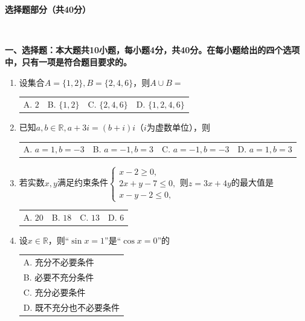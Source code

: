 \documentclass[UTF8]{ctexart}
\newcommand{\tmstrong}[1]{\textbf{#1}}
\begin{document}
\

\

\begin{center}
  {\tmstrong{选择题部分（共40分）}}
\end{center}

\

{\tmstrong{一、选择题：本大题共10小题，每小题4分，共40分。在每小题给出的四个选项中，只有一项是符合题目要求的。}}
\begin{enumerate}
  \item 设集合$A = \{ 1, 2 \}, B = \{ 2, 4, 6 \}$，则$A \cup B =$
  
  {\noindent}\begin{tabularx}{1.0\textwidth}{@{}X@{}@{}X@{}@{}X@{}@{}X@{}}
    A. $2$ & B. $\{ 1, 2 \}$ & C. $\{ 2, 4, 6 \}$ & D. $\{ 1, 2, 4, 6 \}$
  \end{tabularx}
  
  \item 已知$a, b \in \mathbb{R}, a + 3 i = (b + i)
  i$（$i$为虚数单位），则
  
  {\noindent}\begin{tabularx}{1.0\textwidth}{@{}X@{}@{}X@{}@{}X@{}@{}X@{}}
    A. $a = 1, b = - 3$ & B. $a = - 1, b = 3$ & C. $a = - 1, b = - 3$ & D. $a
    = 1, b = 3$
  \end{tabularx}
  
  \item 若实数$x, y$满足约束条件$\left\{\begin{array}{l}
    x - 2 \geqslant 0,\\
    2 x + y - 7 \leqslant 0,\\
    x - y - 2 \leqslant 0,
  \end{array}\right.$则$z = 3 x + 4 y$的最大值是
  
  {\noindent}\begin{tabularx}{1.0\textwidth}{@{}X@{}@{}X@{}@{}X@{}@{}X@{}}
    A. $20$ & B. $18$ & C. $13$ & D. $6$
  \end{tabularx}
  
  \item 设$x \in \mathbb{R}$，则``$\sin x = 1$''是``$\cos x = 0$''的
  
  {\noindent}\begin{tabularx}{1.0\textwidth}{@{}X@{}}
    A. 充分不必要条件\\
    B. 必要不充分条件\\
    C. 充分必要条件\\
    D. 既不充分也不必要条件
  \end{tabularx}
  

\end{enumerate}
\end{document}
